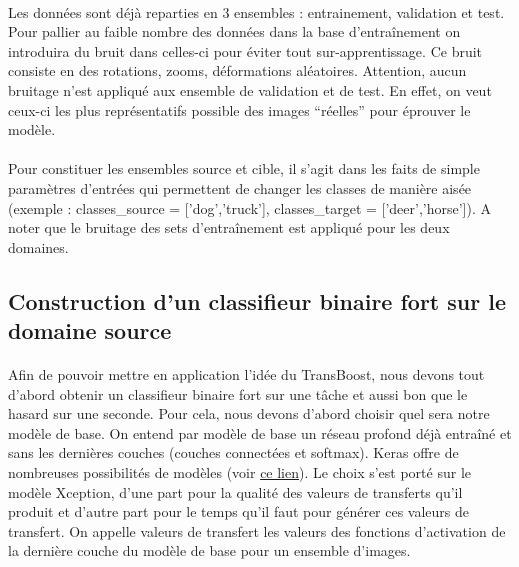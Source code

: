 \documentclass[11 pt]{article}
\begin{document}
\paragraph{}Les données sont déjà reparties en 3 ensembles : entrainement, validation et test. Pour pallier au faible nombre des données dans la base d’entraînement on introduira du bruit dans celles-ci pour éviter tout sur-apprentissage. Ce bruit consiste en des rotations, zooms, déformations aléatoires. Attention, aucun bruitage n’est appliqué aux ensemble de validation et de test. En effet, on veut ceux-ci les plus représentatifs possible des images “réelles” pour éprouver le modèle.

\paragraph{}Pour constituer les ensembles source et cible, il s’agit dans les faits de simple paramètres d’entrées qui permettent de changer les classes de manière aisée (exemple : classes\_source = ['dog','truck'], classes\_target = ['deer','horse']). A noter que le bruitage des sets d’entraînement est appliqué pour les deux domaines.

\subsection{Construction d'un classifieur binaire fort sur le domaine source}
\paragraph{}Afin de pouvoir mettre en application l’idée du TransBoost, nous devons tout d’abord obtenir un classifieur binaire fort sur une tâche et aussi bon que le hasard sur une seconde. Pour cela, nous devons d’abord choisir quel sera notre modèle de base. On entend par modèle de base un réseau profond déjà entraîné et sans les dernières couches (couches connectées et softmax). Keras offre de nombreuses possibilités de modèles (voir \href{https://keras.io/applications/}{ce lien}). Le choix s’est porté sur le modèle Xception, d’une part pour la qualité des valeurs de transferts qu’il produit et d’autre part pour le temps qu’il faut pour générer ces valeurs de transfert. On appelle valeurs de transfert les valeurs des fonctions d’activation de la dernière couche du modèle de base pour un ensemble d’images.
\end{document}
